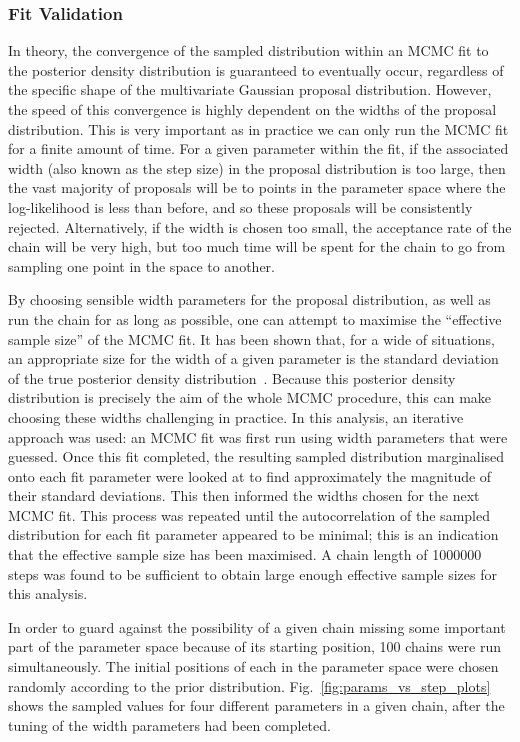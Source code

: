\subsubsection{Fit Validation}
In theory, the convergence of the sampled distribution within an MCMC fit to the posterior density distribution is guaranteed to eventually occur, regardless of the specific shape of the multivariate Gaussian proposal distribution. However, the speed of this convergence is highly dependent on the widths of the proposal distribution. This is very important as in practice we can only run the MCMC fit for a finite amount of time. For a given parameter within the fit, if the associated width (also known as the step size) in the proposal distribution is too large, then the vast majority of proposals will be to points in the parameter space where the log-likelihood is less than before, and so these proposals will be consistently rejected. Alternatively,  if the width is chosen too small, the acceptance rate of the chain will be very high, but too much time will be spent for the chain to go from sampling one point in the space to another.

By choosing sensible width parameters for the proposal distribution, as well as run the chain for as long as possible, one can attempt to maximise the ``effective sample size'' of the MCMC fit. It has been shown that, for a wide of situations, an appropriate size for the width of a given parameter is the standard deviation of the true posterior density distribution~\cite{gelmanChapter11Basics2013}. %
Because this posterior density distribution is precisely the aim of the whole MCMC procedure, this can make choosing these widths challenging in practice. In this analysis, an iterative approach was used: an MCMC fit was first run using width parameters that were guessed. Once this fit completed, the resulting sampled distribution marginalised onto each fit parameter were looked at to find approximately the magnitude of their standard deviations. This then informed the widths chosen for the next MCMC fit. This process was repeated until the autocorrelation of the sampled distribution for each fit parameter appeared to be minimal; this is an indication that the effective sample size has been maximised. A chain length of \num{1000000} steps was found to be sufficient to obtain large enough effective sample sizes for this analysis.

In order to guard against the possibility of a given chain missing some important part of the parameter space because of its starting position, 100 chains were run simultaneously. The initial positions of each in the parameter space were chosen randomly according to the prior distribution. Fig.~\ref{fig:params_vs_step_plots} shows the sampled values for four different parameters in a given chain, after the tuning of the width parameters had been completed.

